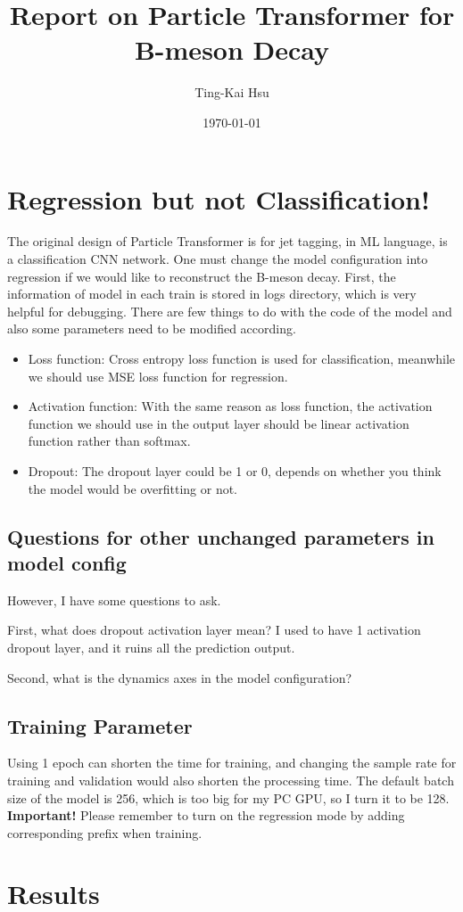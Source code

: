 \documentclass[12pt]{article}
\title{Report on Particle Transformer for B-meson Decay}
\author{Ting-Kai Hsu}
\date{\today}
\numberwithin{equation}{section}
\begin{document}
\maketitle
\tableofcontents
\section{Regression but not Classification!}
The original design of Particle Transformer is for jet tagging, in ML language, is a classification CNN network.
One must change the model configuration into regression if we would like to reconstruct the B-meson decay.
First, the information of model in each train is stored in logs directory, which is very helpful for debugging.
There are few things to do with the code of the model and also some parameters need to be modified according.
\begin{itemize}
    \item Loss function: Cross entropy loss function is used for classification, meanwhile we should use MSE loss function for regression.
    \item Activation function: With the same reason as loss function, the activation function we should use in the output layer should be linear activation function rather than softmax.
    \item Dropout: The dropout layer could be 1 or 0, depends on whether you think the model would be overfitting or not.
\end{itemize}
\subsection{Questions for other unchanged parameters in model config}
However, I have some questions to ask.

First, what does dropout activation layer mean?
I used to have 1 activation dropout layer, and it ruins all the prediction output.

Second, what is the dynamics axes in the model configuration?

\subsection{Training Parameter}
Using 1 epoch can shorten the time for training, and changing the sample rate for training and validation would also shorten the processing time.
The default batch size of the model is 256, which is too big for my PC GPU, so I turn it to be 128.
\textbf{Important!} Please remember to turn on the regression mode by adding corresponding prefix when training.

\section{Results}
\end{document}
